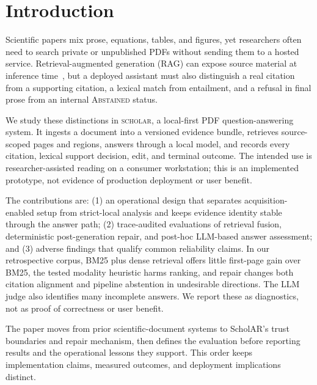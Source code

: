 \section{Introduction}
Scientific papers mix prose, equations, tables, and figures, yet researchers often need to search private or unpublished PDFs without sending them to a hosted service. Retrieval-augmented generation (RAG) can expose source material at inference time~\citep{lewis2020rag}, but a deployed assistant must also distinguish a real citation from a supporting citation, a lexical match from entailment, and a refusal in final prose from an internal \textsc{Abstained} status.

We study these distinctions in \textsc{scholar}, a local-first PDF question-answering system. It ingests a document into a versioned evidence bundle, retrieves source-scoped pages and regions, answers through a local model, and records every citation, lexical support decision, edit, and terminal outcome. The intended use is researcher-assisted reading on a consumer workstation; this is an implemented prototype, not evidence of production deployment or user benefit.

The contributions are: (1) an operational design that separates acquisition-enabled setup from strict-local analysis and keeps evidence identity stable through the answer path; (2) trace-audited evaluations of retrieval fusion, deterministic post-generation repair, and post-hoc LLM-based answer assessment; and (3) adverse findings that qualify common reliability claims. In our retrospective corpus, BM25 plus dense retrieval offers little first-page gain over BM25, the tested modality heuristic harms ranking, and repair changes both citation alignment and pipeline abstention in undesirable directions. The LLM judge also identifies many incomplete answers. We report these as diagnostics, not as proof of correctness or user benefit.

The paper moves from prior scientific-document systems to ScholAR's trust boundaries and repair mechanism, then defines the evaluation before reporting results and the operational lessons they support. This order keeps implementation claims, measured outcomes, and deployment implications distinct.
